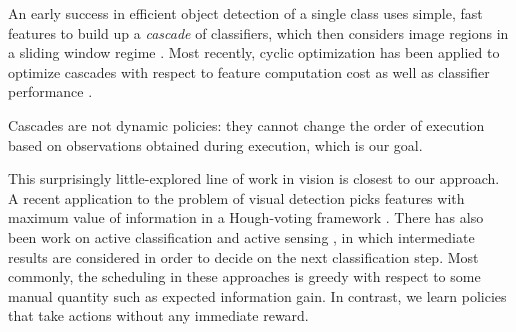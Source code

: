 An early success in efficient object detection of a single class uses simple, fast features to build up a \emph{cascade} of classifiers, which then considers image regions in a sliding window regime \cite{Viola2001}.
Most recently, cyclic optimization has been applied to optimize cascades with respect to feature computation cost as well as classifier performance \cite{Chen2012}.

Cascades are not dynamic policies: they cannot change the order of execution based on observations obtained during execution, which is our goal.

This surprisingly little-explored line of work in vision is closest to our approach.
A recent application to the problem of visual detection picks features with maximum value of information in a Hough-voting framework \cite{Vijayanarasimhan2010}. 
There has also been work on active classification \cite{Gao2011} and active sensing \cite{Yu2009}, in which intermediate results are considered in order to decide on the next classification step.
Most commonly, the scheduling in these approaches is greedy with respect to some manual quantity such as expected information gain.
In contrast, we learn policies that take actions without any immediate reward.
